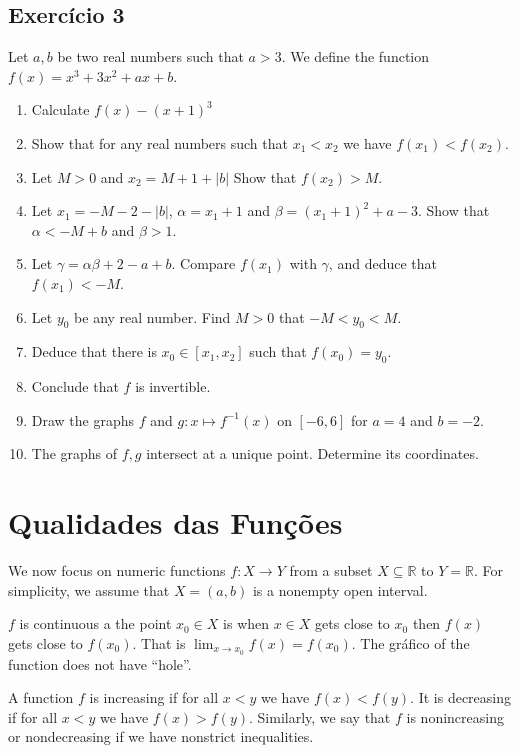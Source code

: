 \subsection*{Exercício 3}

Let $a,b$ be two real numbers such that $a > 3$. We define the function
$f(x) = x^3 + 3x^2 + ax + b$.

\begin{enumerate}
\item Calculate $f(x) - {(x+1)}^3$
\item Show that for any real numbers such that $x_1 < x_2$ we have
  $f(x_1) < f(x_2)$.
\item Let $M > 0$ and $x_2 = M+1+|b|$ Show that $f(x_2) > M$.
\item Let $x_1 = -M - 2 - |b|$, $\alpha = x_1+1$
  and $\beta = {(x_1+1)}^2+a-3$. Show that $\alpha < -M + b$ and
  $\beta > 1$.
\item Let $\gamma=\alpha\beta+2-a+b$. Compare $f(x_1)$ with $\gamma$, and
  deduce that $f(x_1) < -M$.
\item Let $y_0$ be any real number. Find $M > 0$ that $-M < y_0 < M$.
\item Deduce that there is $x_0 \in [x_1,x_2]$ such that $f(x_0) = y_0$.
\item Conclude that $f$ is invertible.
\item Draw the graphs $f$ and $g: x \mapsto f^{-1}(x)$ on $[-6,6]$ for
  $a=4$ and $b=-2$.
\item The graphs of $f,g$ intersect at a unique point.
  Determine its coordinates.
\end{enumerate}

\section{Qualidades das Funções}

We now focus on numeric functions $f: X \rightarrow Y$ from a subset
$X \subseteq \mathbb R$ to $Y=\mathbb R$. For simplicity, we assume that
$X = (a,b)$ is a nonempty open interval.

$f$ is continuous a the point $x_0 \in X$ is when $x \in X$ gets close to
$x_0$ then $f(x)$ gets close to $f(x_0)$. That is
$\lim_{x \rightarrow x_0} f(x) = f(x_0)$. The gráfico of the function does not
have ``hole''.

A function $f$ is increasing if for all $x < y$ we have $f(x) < f(y)$.
It is decreasing if for all $x < y$ we have $f(x) > f(y)$.
Similarly, we say that $f$ is nonincreasing or nondecreasing if we have
nonstrict inequalities.

